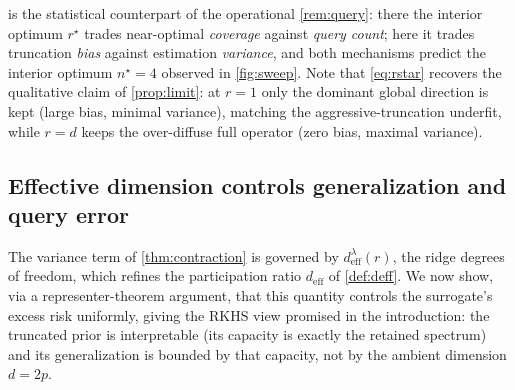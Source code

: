 \documentclass[aps,prxquantum,reprint,amsmath,amssymb,floatfix,nofootinbib,superscriptaddress,longbibliography]{revtex4-2}
\theoremstyle{remark}
\begin{document}
 is the statistical counterpart of the operational
\cref{rem:query}: there the interior optimum \(r^{\star}\) trades near-optimal
\emph{coverage} against \emph{query count}; here it trades truncation \emph{bias}
against estimation \emph{variance}, and both mechanisms predict the interior
optimum \(n^{\star}{=}4\) observed in \cref{fig:sweep}. Note that
\eqref{eq:rstar} recovers the qualitative claim of \cref{prop:limit}: at
\(r{=}1\) only the dominant global direction is kept (large bias, minimal
variance), matching the aggressive-truncation underfit, while \(r{=}d\) keeps the
over-diffuse full operator (zero bias, maximal variance).

\subsection{Effective dimension controls generalization and query error}
\label{sec:rkhs}

The variance term of \cref{thm:contraction} is governed by
\(d_{\mathrm{eff}}^{\lambda}(r)\), the ridge degrees of freedom, which refines the
participation ratio \(d_{\mathrm{eff}}\) of \cref{def:deff}. We now show, via a
representer-theorem argument, that this quantity controls the surrogate's excess
risk uniformly, giving the RKHS view promised in the introduction: the truncated
prior is interpretable (its capacity is exactly the retained spectrum) and its
generalization is bounded by that capacity, not by the ambient dimension \(d=2p\).
\end{document}
